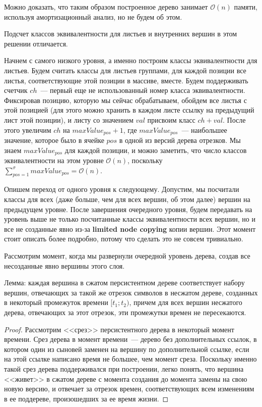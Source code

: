 Можно доказать, что таким образом построенное дерево занимает $\mathcal{O}(n)$ памяти, используя амортизационный анализ, но не будем об этом. 

Подсчет классов эквивалентности для листьев и внутренних вершин в этом решении отличается.

Начнем с самого низкого уровня, а именно построим классы эквивалентности для листьев. Будем считать классы для листьев группами, для каждой позиции все листья, соответствующие этой позиции в массиве, вместе. Будем поддерживать счетчик $ch$~--- первый еще не использованный номер класса эквивалентности. Фиксировав позицию, которую мы сейчас обрабатываем, обойдем все листья с этой позицией (для этого можно хранить в каждом листе ссылку на предыдущий лист этой позиции), и листу со значением $val$ присвоим класс $ch+val$. После этого увеличим $ch$ на $maxValue_{pos}+1$, где $maxValue_{pos}$~--- наибольшее значение, которое было в ячейке $pos$ в одной из версий дерева отрезков. Мы знаем $maxValue_{pos}$ для каждой позиции, и можно заметить, что число классов эквивалентности на этом уровне $\mathcal{O}(n)$, поскольку $\sum \limits_{pos=1}^{\sigma} maxValue_{pos} = \mathcal{O}(n)$.

Опишем переход от одного уровня к следующему. Допустим, мы посчитали классы для всех (даже больше, чем для всех вершин, об этом далее) вершин на предыдущем уровне. После завершения очередного уровня, будем передавать на уровень выше не только посчитанные классы эквивалентности всех вершин, но и все не созданные явно из-за \textbf{limited node copying} копии вершин. Этот момент стоит описать более подробно, потому что сделать это не совсем тривиально. 

Рассмотрим момент, когда мы развернули очередной уровень дерева, создав все несозданные явно вершины этого слоя.

Лемма: каждая вершина в сжатом персистентном дереве соответствует набору вершин, отвечающих за такой же отрезок символов в несжатом дереве, созданных в некоторый промежуток времени $[t_1; t_2)$, причем для всех вершин несжатого дерева, отвечающих за этот отрезок, эти промежутки времен не пересекаются.

\begin{proof}
Рассмотрим <<срез>> персистентного дерева в некоторый момент времени. Срез дерева в момент времени~--- дерево без дополнительных ссылок, в котором один из сыновей заменен на вершину по дополнительной ссылке, если на этой ссылке написано время не большее, чем момент среза. Поскольку именно такой срез дерева поддерживался при построении, легко понять, что вершина <<живет>> в сжатом дереве с момента создания до момента замены на свою новую версию, и отвечает за отрезок времен, соответствующих всем изменениям в ее поддереве, произошедших за ее время жизни.
\end{proof} 

